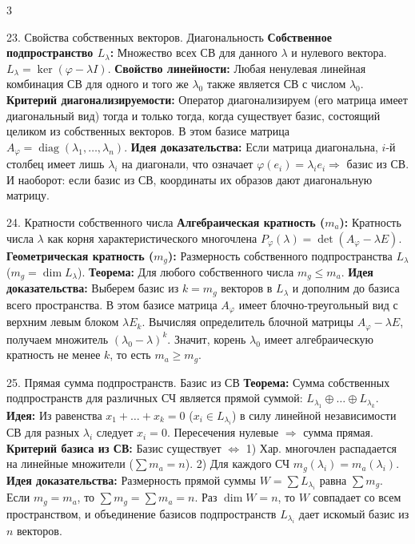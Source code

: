 \documentclass[8pt, a4paper, landscape]{extarticle}
\newcommand{\Ra}{\Rightarrow}
\begin{document}
\begin{multicols*}{3}
\begin{ticket}{23. Свойства собственных векторов. Диагональность}
\textbf{Собственное подпространство $L_\lambda$:} Множество всех СВ для данного $\lambda$ и нулевого вектора. $L_\lambda = \ker(\varphi - \lambda I)$. 
\textbf{Свойство линейности:} Любая ненулевая линейная комбинация СВ для одного и того же $\lambda_0$ также является СВ с числом $\lambda_0$.
\tcblower
\textbf{Критерий диагонализируемости:} Оператор диагонализируем (его матрица имеет диагональный вид) тогда и только тогда, когда существует базис, состоящий целиком из собственных векторов. В этом базисе матрица $A_\varphi = \operatorname{diag}(\lambda_1, \dots, \lambda_n)$.
\textbf{Идея доказательства:} Если матрица диагональна, $i$-й столбец имеет лишь $\lambda_i$ на диагонали, что означает $\varphi(e_i) = \lambda_i e_i \Ra$ базис из СВ. И наоборот: если базис из СВ, координаты их образов дают диагональную матрицу.
\end{ticket}

\begin{ticket}{24. Кратности собственного числа}
\textbf{Алгебраическая кратность ($m_a$):} Кратность числа $\lambda$ как корня характеристического многочлена $P_\varphi(\lambda) = \det(A_\varphi - \lambda E)$.
\textbf{Геометрическая кратность ($m_g$):} Размерность собственного подпространства $L_\lambda$ ($m_g = \dim L_\lambda$).
\tcblower
\textbf{Теорема:} Для любого собственного числа $m_g \le m_a$.
\textbf{Идея доказательства:} Выберем базис из $k=m_g$ векторов в $L_\lambda$ и дополним до базиса всего пространства. В этом базисе матрица $A_\varphi$ имеет блочно-треугольный вид с верхним левым блоком $\lambda E_k$. 
Вычисляя определитель блочной матрицы $A_\varphi - \lambda E$, получаем множитель $(\lambda_0 - \lambda)^k$. Значит, корень $\lambda_0$ имеет алгебраическую кратность не менее $k$, то есть $m_a \ge m_g$.
\end{ticket}

\begin{ticket}{25. Прямая сумма подпространств. Базис из СВ}
\textbf{Теорема:} Сумма собственных подпространств для различных СЧ является прямой суммой: $L_{\lambda_1} \oplus \dots \oplus L_{\lambda_k}$.
\textbf{Идея:} Из равенства $x_1 + \dots + x_k = 0$ ($x_i \in L_{\lambda_i}$) в силу линейной независимости СВ для разных $\lambda_i$ следует $x_i = 0$. Пересечения нулевые $\Ra$ сумма прямая.
\tcblower
\textbf{Критерий базиса из СВ:} Базис существует $\Leftrightarrow$ 
1) Хар. многочлен распадается на линейные множители ($\sum m_a = n$). 
2) Для каждого СЧ $m_g(\lambda_i) = m_a(\lambda_i)$.
\textbf{Идея доказательства:} Размерность прямой суммы $W = \sum L_{\lambda_i}$ равна $\sum m_g$. Если $m_g = m_a$, то $\sum m_g = \sum m_a = n$. Раз $\dim W = n$, то $W$ совпадает со всем пространством, и объединение базисов подпространств $L_{\lambda_i}$ дает искомый базис из $n$ векторов.
\end{ticket}


\end{multicols*}
\end{document}
